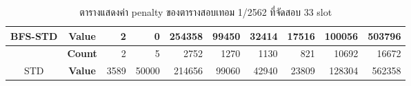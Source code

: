 \begin{table}[]
{\begin{tabular}{@{}ccrrrrrrrr@{}}
    \multirow{-2}{*}{BFS-STD}                    & \textbf{Value}                        & 2                              & 0                              & 254358                         & 99450                          & 32414                          & 17516                          & 100056                         & 503796                           \\ \midrule
                                                  & {\textbf{Count}} & {2}       & {5}       & {2752}    & {1270}    & {1130}    & {821}     & {10692}   & {16672}     \\ \cmidrule(l){2-10} 
    \multirow{-2}{*}{STD} & {\textbf{Value}} & {3589}    & {50000}   & {214656}  & {99060}   & {42940}   & {23809}   & {128304}  & {562358}    \\ \bottomrule
    \end{tabular}%
    }
    \caption{ตารางแสดงค่า penalty ของตารางสอบเทอม 1/2562 ที่จัดสอบ 33 slot}
    \label{tab:result_table_162_33}
\end{table}
